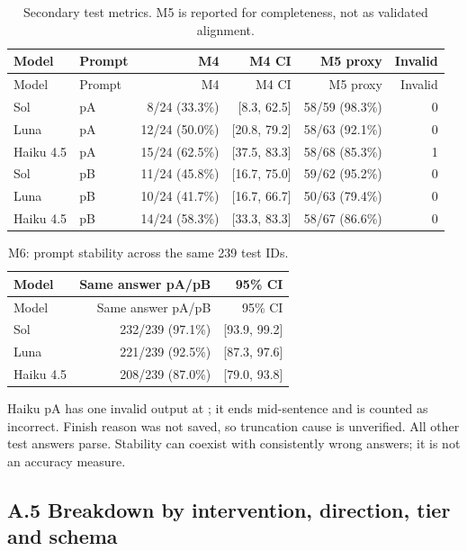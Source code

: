 \documentclass[11pt,a4paper]{article}
\begin{document}
\begingroup\small\setlength{\tabcolsep}{4pt}
\begin{longtable}{llrrrr}
\caption{Secondary test metrics. M5 is reported for completeness, not as validated alignment.}\\
\toprule
Model & Prompt & M4 & M4 CI & M5 proxy & Invalid \\
\midrule\endfirsthead
\toprule
Model & Prompt & M4 & M4 CI & M5 proxy & Invalid \\
\midrule\endhead
\bottomrule\endfoot
Sol & pA & 8/24 (33.3\%) & [8.3, 62.5] & 58/59 (98.3\%) & 0 \\
Luna & pA & 12/24 (50.0\%) & [20.8, 79.2] & 58/63 (92.1\%) & 0 \\
Haiku 4.5 & pA & 15/24 (62.5\%) & [37.5, 83.3] & 58/68 (85.3\%) & 1 \\
Sol & pB & 11/24 (45.8\%) & [16.7, 75.0] & 59/62 (95.2\%) & 0 \\
Luna & pB & 10/24 (41.7\%) & [16.7, 66.7] & 50/63 (79.4\%) & 0 \\
Haiku 4.5 & pB & 14/24 (58.3\%) & [33.3, 83.3] & 58/67 (86.6\%) & 0 \\
\end{longtable}\endgroup


\begingroup\small\setlength{\tabcolsep}{4pt}
\begin{longtable}{lrr}
\caption{M6: prompt stability across the same 239 test IDs.}\\
\toprule
Model & Same answer pA/pB & 95\% CI \\
\midrule\endfirsthead
\toprule
Model & Same answer pA/pB & 95\% CI \\
\midrule\endhead
\bottomrule\endfoot
Sol & 232/239 (97.1\%) & [93.9, 99.2] \\
Luna & 221/239 (92.5\%) & [87.3, 97.6] \\
Haiku 4.5 & 208/239 (87.0\%) & [79.0, 93.8] \\
\end{longtable}\endgroup


Haiku pA has one invalid output at ; it ends mid-sentence and is counted as incorrect. Finish reason was not saved, so truncation cause is unverified. All other test answers parse. Stability can coexist with consistently wrong answers; it is not an accuracy measure.

\subsection*{A.5 Breakdown by intervention, direction, tier and schema}
\end{document}
